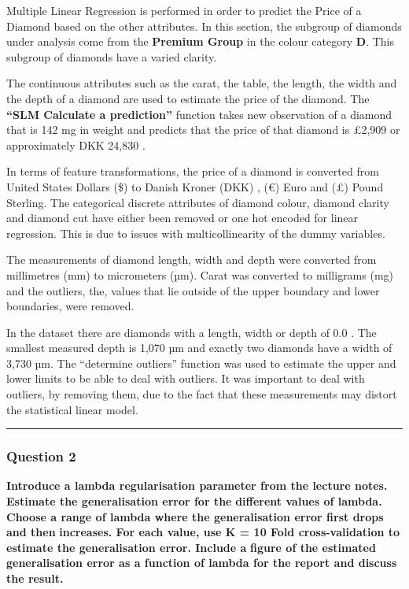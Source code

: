 \documentclass[
]{article}
\begin{document}
Multiple Linear Regression is performed in order to predict the Price of
a Diamond based on the other attributes. In this section, the subgroup
of diamonds under analysis come from the \textbf{Premium Group} in the
colour category \textbf{D}. This subgroup of diamonds have a varied
clarity.

The continuous attributes such as the carat, the table, the length, the
width and the depth of a diamond are used to estimate the price of the
diamond. The \textbf{``SLM Calculate a prediction''} function takes new
observation of a diamond that is 142 mg in weight and predicts that the
price of that diamond is £2,909 or approximately DKK 24,830 .

In terms of feature transformations, the price of a diamond is converted
from United States Dollars (\$) to Danish Kroner (DKK) , (€) Euro and
(£) Pound Sterling. The categorical discrete attributes of diamond
colour, diamond clarity and diamond cut have either been removed or one
hot encoded for linear regression. This is due to issues with
multicollinearity of the dummy variables.

The measurements of diamond length, width and depth were converted from
millimetres (mm) to micrometers (µm). Carat was converted to milligrams
(mg) and the outliers, the, values that lie outside of the upper
boundary and lower boundaries, were removed.

In the dataset there are diamonds with a length, width or depth of 0.0 .
The smallest measured depth is 1,070 µm and exactly two diamonds have a
width of 3,730 µm. The ``determine outliers'' function was used to
estimate the upper and lower limits to be able to deal with outliers. It
was important to deal with outliers, by removing them, due to the fact
that these measurements may distort the statistical linear model.

\begin{center}\rule{0.5\linewidth}{0.5pt}\end{center}

\hypertarget{question-2}{%
\subsubsection{Question 2}\label{question-2}}

\textbf{Introduce a lambda regularisation parameter from the lecture
notes. Estimate the generalisation error for the} \textbf{different
values of lambda. Choose a range of lambda where the generalisation
error first drops and then} \textbf{increases. For each value, use K =
10 Fold cross-validation to estimate the generalisation error. Include
a} \textbf{figure of the estimated generalisation error as a function of
lambda for the report and discuss the result.}
\end{document}
